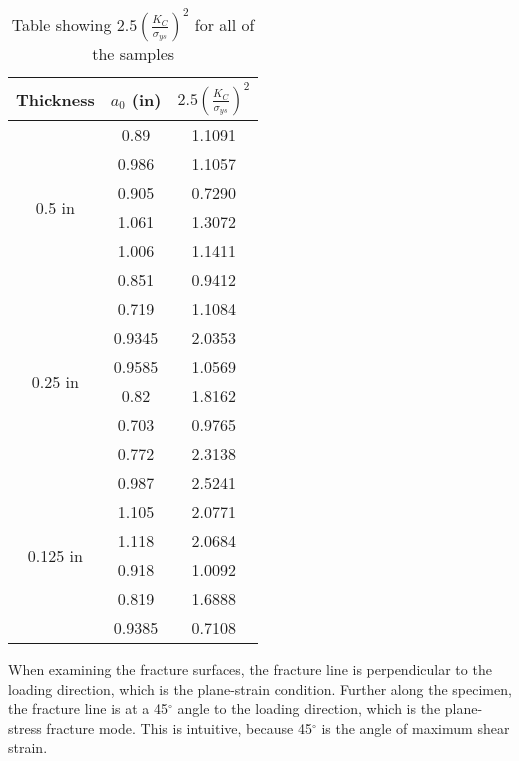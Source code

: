 \begin{table}[H]
\centering
\begin{tabular}{|c|c|c|}
\hline
\textbf{Thickness}        & \textbf{$a_0$ (in)} & \textbf{$2.5(\frac{K_C}{\sigma_{ys}})^2$} \\ \hline
\multirow{6}{*}{0.5 in}   & 0.89           & 1.1091     \\ \cline{2-3} 
                          & 0.986          & 1.1057     \\ \cline{2-3} 
                          & 0.905          & 0.7290     \\ \cline{2-3} 
                          & 1.061          & 1.3072     \\ \cline{2-3} 
                          & 1.006          & 1.1411     \\ \cline{2-3} 
                          & 0.851          & 0.9412     \\ \hline
\multirow{6}{*}{0.25 in}  & 0.719          & 1.1084     \\ \cline{2-3} 
                          & 0.9345         & 2.0353     \\ \cline{2-3} 
                          & 0.9585         & 1.0569     \\ \cline{2-3} 
                          & 0.82           & 1.8162     \\ \cline{2-3} 
                          & 0.703          & 0.9765     \\ \cline{2-3} 
                          & 0.772          & 2.3138     \\ \hline
\multirow{6}{*}{0.125 in} & 0.987          & 2.5241     \\ \cline{2-3} 
                          & 1.105          & 2.0771     \\ \cline{2-3} 
                          & 1.118          & 2.0684     \\ \cline{2-3} 
                          & 0.918          & 1.0092     \\ \cline{2-3} 
                          & 0.819          & 1.6888     \\ \cline{2-3} 
                          & 0.9385         & 0.7108     \\ \hline
\end{tabular}
\caption{Table showing $2.5(\frac{K_C}{\sigma_{ys}})^2$ for all of the samples}
\label{table:K_IC}
\end{table}

When examining the fracture surfaces, the fracture line is perpendicular to the loading direction, which is the plane-strain condition. Further along the specimen, the fracture line is at a 45$^\circ$ angle to the loading direction, which is the plane-stress fracture mode. This is intuitive, because 45$^\circ$ is the angle of maximum shear strain.

